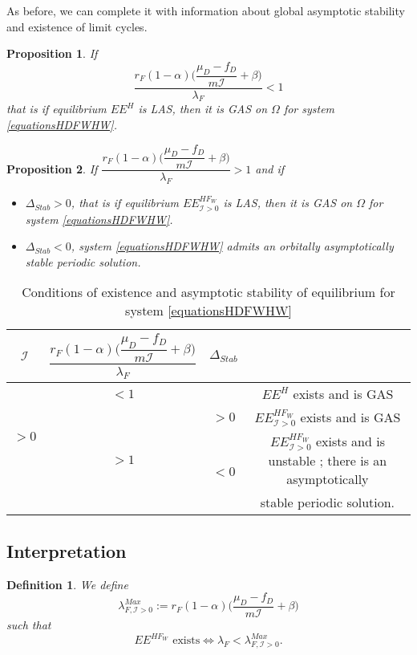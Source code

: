 \documentclass{article}
\newcommand{\lfw}{\lambda_{F}}
\newcommand{\lfw}{\lambda_{F}}
\newcommand{\cI}{\mathcal{I}}
\newtheorem{prop}{Proposition}
\newtheorem{definition}{Definition}
\begin{document}
As before, we can complete it with information about global asymptotic stability and existence of limit cycles. 

\begin{prop}
If $$\dfrac{r_F(1-\alpha)\Big({\dfrac{\mu_D - f_D}{m\cI}+\beta\Big)}}{\lfw} < 1$$
that is if equilibrium $EE^{H}$ is LAS, then it is GAS on $\Omega$ for system \eqref{equationsHDFWHW}.
\end{prop}


\begin{prop}
If $\dfrac{r_F(1-\alpha)\Big({\dfrac{\mu_D - f_D}{m\cI}+\beta\Big)}}{\lfw} > 1$ and if 

\begin{itemize}
\item $\Delta_{Stab} > 0$, that is if equilibrium $EE^{HF_W}_{\cI >0}$ is LAS, then it is GAS on $\Omega$ for system \eqref{equationsHDFWHW}.
\item $\Delta_{Stab} < 0$, system \eqref{equationsHDFWHW} admits an orbitally asymptotically stable periodic solution.
\end{itemize}
\end{prop}



\begin{table}[!ht]
\def\arraystretch{2}
\centering
\begin{tabular}{c|c|c|c}
$\cI$ & $\dfrac{r_F(1-\alpha)\Big({\dfrac{\mu_D - f_D}{m\cI}+\beta\Big)}}{\lfw} $ & $\Delta_{Stab}$ & \\
\hline
\multirow{3}{*}{$>0$} & $<1$ & &$EE^{H}$ exists and is GAS \\
\cline{2-4}
 & \multirow{3}{*}{$> 1$}  & $>0$ &$EE^{HF_W}_{\cI>0}$ exists and is GAS\\
 \cline{3-4}
 & & \multirow{2}{*}{$ < 0$} & $EE^{HF_W}_{\cI>0}$ exists and is unstable ; there is an asymptotically \\
 & & &  stable periodic solution. \\
\end{tabular}
\caption{\centering Conditions of existence and asymptotic stability of equilibrium for system \eqref{equationsHDFWHW}}
\end{table}

\subsection{Interpretation}

\begin{definition}
We define 
$$\lambda_{F, \cI>0}^{Max} := r_F(1-\alpha)\Big({\dfrac{\mu_D - f_D}{m\cI}+\beta\Big)}$$
such that 
$$
\text{$EE^{HF_W}$ exists} \Leftrightarrow  \lfw < \lambda_{F, \cI>0}^{Max}.
$$
\end{definition}
\end{document}
